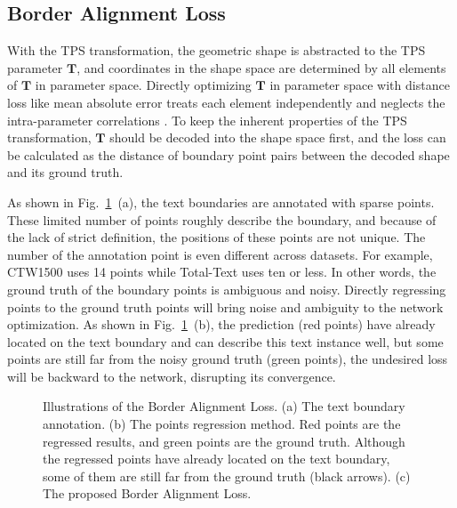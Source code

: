 \documentclass[sigconf]{acmart}
\begin{document}
	
	\subsection{Border Alignment Loss}
	With the TPS transformation, the geometric shape is abstracted to the TPS parameter $\mathbf{T}$, and coordinates in the shape space are determined by all elements of  $\mathbf{T}$ in parameter space. Directly optimizing $\mathbf{T}$ in parameter space with distance loss like mean absolute error treats each element independently and neglects the intra-parameter correlations \cite{Wang2020textray}. To keep the inherent properties of the TPS transformation,
	$\mathbf{T}$ should be decoded into the shape space first, and the loss can be calculated as the distance of boundary point pairs between the decoded shape and its ground truth.
	
	As shown in Fig.~\ref{fig:loss}~(a), the text boundaries are annotated with sparse points. These limited number of points roughly describe the boundary, and because of the lack of strict definition, the positions of these points are not unique. The number of the annotation point is even different across datasets. For example, CTW1500 uses 14 points while Total-Text uses ten or less. In other words, the ground truth of the boundary points is ambiguous and noisy. Directly regressing points to the ground truth points will bring noise and ambiguity to the network optimization. As shown in Fig.~\ref{fig:loss}~(b), the prediction (red points) have already located on the text boundary and can describe this text instance well, but some points are still far from the noisy ground truth (green points), the undesired loss will be backward to the network, disrupting its convergence.
	
	\begin{figure}[t]
		\vspace{-0.15cm} 
		\centering
		\setlength{\abovecaptionskip}{5px}
		\subfigbottomskip=-3pt
		\subfigcapskip=-5pt
		\caption{ Illustrations of the Border Alignment Loss. (a) The text boundary annotation. (b) The points regression method. Red points are the regressed results, and green points are the ground truth. Although the regressed points have already located on the text boundary, some of them are still far from the ground truth (black arrows). (c) The proposed Border Alignment Loss.}
		\label{fig:loss}
		\vspace{-15px}
	\end{figure}
	
\end{document}
